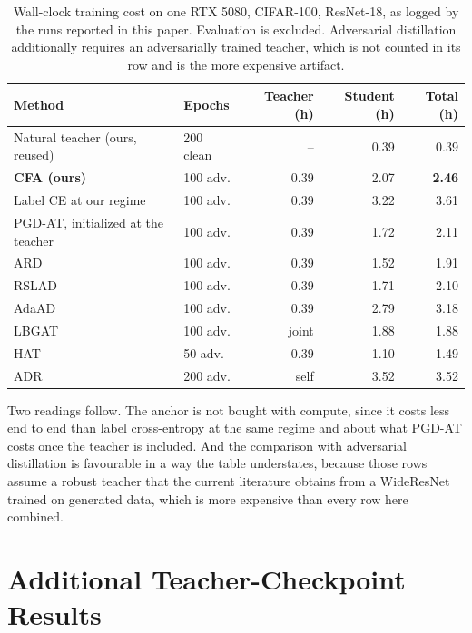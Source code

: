 \begin{table}[!htbp]
  \centering \small \setlength{\tabcolsep}{5pt}
  \caption{Wall-clock training cost on one RTX 5080, CIFAR-100, ResNet-18, as logged by the runs
  reported in this paper. Evaluation is excluded. Adversarial distillation additionally requires an
  adversarially trained teacher, which is not counted in its row and is the more expensive artifact.}
  \label{tab:compute}
  \begin{tabular}{llrrr}
    \toprule
    Method & Epochs & Teacher (h) & Student (h) & Total (h) \\
    \midrule
    Natural teacher (ours, reused) & 200 clean & --   & 0.39 & 0.39 \\
    \midrule
    \textbf{CFA (ours)}            & 100 adv.  & 0.39 & 2.07 & \textbf{2.46} \\
    Label CE at our regime         & 100 adv.  & 0.39 & 3.22 & 3.61 \\
    PGD-AT, initialized at the teacher & 100 adv. & 0.39 & 1.72 & 2.11 \\
    ARD                            & 100 adv.  & 0.39 & 1.52 & 1.91 \\
    RSLAD                          & 100 adv.  & 0.39 & 1.71 & 2.10 \\
    AdaAD                          & 100 adv.  & 0.39 & 2.79 & 3.18 \\
    LBGAT                          & 100 adv.  & joint & 1.88 & 1.88 \\
    HAT                            & 50 adv.   & 0.39 & 1.10 & 1.49 \\
    ADR                            & 200 adv.  & self  & 3.52 & 3.52 \\
    \bottomrule
  \end{tabular}
\end{table}

Two readings follow. The anchor is not bought with compute, since it costs less end to end than label
cross-entropy at the same regime and about what PGD-AT costs once the teacher is included. And the
comparison with adversarial distillation is favourable in a way the table understates, because those
rows assume a robust teacher that the current literature obtains from a WideResNet trained on
generated data, which is more expensive than every row here combined.

\section{Additional Teacher-Checkpoint Results}
\label{app:teachersel}

